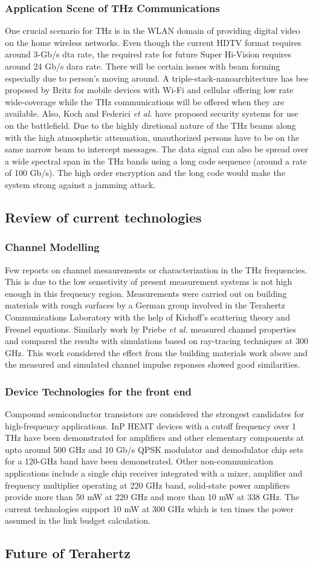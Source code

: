 \documentclass[12pt, letterpaper]{article}
\begin{document}
		\subsubsection{Application Scene of THz Communications}
		One crucial scenario for THz is in the WLAN domain of providing digital video on the home wireless networks. Even though the current HDTV format requires around 3-Gb/s dta rate, the required rate for future Super Hi-Vision requires around 24 Gb/s dara rate. There will be certain issues with beam forming especially due to person's moving around. A triple-stack-nanoarchitecture has bee proposed by Britz for mobile devices with Wi-Fi and cellular offering low rate wide-coverage while the THz communications will be offered when they are available. Also, Koch and Federici \textit{et al.} have proposed security systems for use on the battlefield. Due to the highly diretional nature of the THz beams along with the high atmosphetic attenuation, unauthorized persons have to be on the same narrow beam to intercept messages. The data signal can also be spread over a wide spectral span in the THz bands using a long code sequence (around a rate of 100 Gb/s). The high order encryption and the long code would make the system strong against a jamming attack.
	\subsection{Review of current technologies}
	\subsubsection{Channel Modelling}
	Few reports on channel mesaurements or characterization in the THz frequencies. This is due to the low sensetivity of present measurement systems is not high enough in this frequency region. Measurements were carried out on building materials with rough surfaces by a German group involved in the Terahertz Communications Laboratory with the help of Kichoff's scattering theory and Fresnel equations. Similarly work by Priebe \textit{et al.} measured channel properties and compared the results with simulations based on ray-tracing techniques at 300 GHz. This work considered the effect from the building materials work above and the measured and simulated channel impulse reponses showed good similarities. 
	\subsubsection{Device Technologies for the front end}
	Compound semiconductor transistors are considered the strongest candidates for high-frequency applications. InP HEMT devices with a cutoff frequency over 1 THz have been demonstrated for amplifiers and other elementary components at upto around 500 GHz and 10 Gb/s QPSK modulator and demodulator chip sets for a 120-GHz band have been demonstrated. Other non-communication applications include a single chip receiver integrated with a mixer, amplifier and frequency multiplier operating at 220 GHz band, solid-state power amplifiers provide more than 50 mW at 220 GHz and more than 10 mW at 338 GHz. The current technologies support 10 mW at 300 GHz which is ten times the power assumed in the link budget calculation.	
	\subsection{Future of Terahertz}
\end{document}
